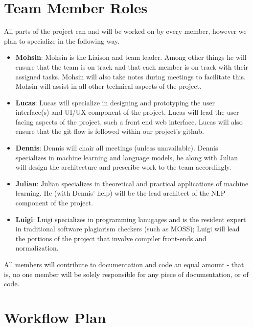 \documentclass{article}
\begin{document}
\section{Team Member Roles}
All parts of the project can and will be worked on by every member, however we plan to specialize in the following way.

\begin{itemize}
    \item \textbf{Mohsin}: Mohsin is the Liaison and team leader. Among other things he will ensure that the team is on track and that each member is on track with their assigned tasks. Mohsin will also take notes during meetings to facilitate this. Mohsin will assist in all other technical aspects of the project.
    \item \textbf{Lucas}: Lucas will specialize in designing and prototyping the user interface(s) and UI/UX component of the project. Lucas will lead the user-facing aspects of the project, such a front end web interface. Lucas will also ensure that the git flow is followed within our project's github.
    \item \textbf{Dennis}: Dennis will chair all meetings (unless unavailable). Dennis specializes in machine learning and language models, he along with Julian will design the architecture and prescribe work to the team accordingly.
    \item \textbf{Julian}: Julian specializes in theoretical and practical applications of machine learning. He (with Dennis' help) will be the lead architect of the NLP component of the project.
    \item \textbf{Luigi}: Luigi specializes in programming lanugages and is the resident expert in traditional software plagiarism checkers (such as MOSS); Luigi will lead the portions of the project that involve compiler front-ends and normalization.
\end{itemize}

All members will contribute to documentation and code an equal amount - that is, no one member will be solely responsible for any piece of documentation, or of code.

\section{Workflow Plan}
\end{document}
